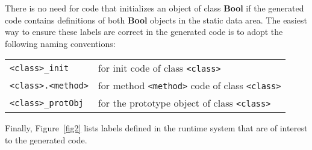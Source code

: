 \documentclass[11pt]{article}
\def\C#1{{\bf{}#1}}
\begin{document}
There is no need for code that initializes an object of class \C{Bool}
if the generated code contains definitions of both \C{Bool} objects
in the static data area.
The easiest way to ensure these labels are correct in the generated code 
is to adopt the following naming conventions:
\begin{center}
\begin{tabular}{ll}
\verb#<class>_init#	&	for init code of class
\verb#<class>#\\
\verb#<class>.<method>#	&	for method \verb#<method># code of class
\verb#<class>#\\
\verb#<class>_protObj#	&	for the prototype object of class
\verb#<class>#\\
\end{tabular}
\end{center}
Finally, Figure~\ref{fig2} lists labels defined in the runtime system that are of
interest to the generated code.
\end{document}
